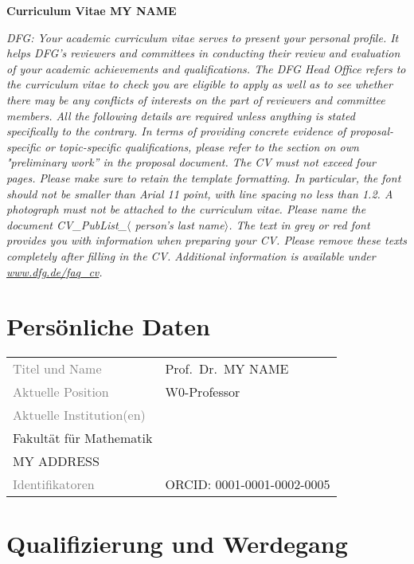 \documentclass[a4paper,11pt]{article} %
\def\mytitle{Prof.\ Dr.\ }
\def\myname{MY NAME}
\def\myinstitute{\begin{minipage}[t]{8cm}
MY UNIVERSITY\\
Fakultät für Mathematik\\
MY ADDRESS
\end{minipage}\vspace{.3ex}}
\def\myORCID{0001-0001-0002-0005} %
\def\myidentifier{ORCID: \myORCID}
\def\myposition{W0-Professor}
\begin{document}


\thispagestyle{empty}

\mbox{}
\vspace{-9ex}

\centerline{\Large \bf Curriculum Vitae \myname}
\emph{DFG: Your academic curriculum vitae serves to present your personal profile. It helps DFG’s reviewers and committees in conducting their review and evaluation of your academic achievements and qualifications. The DFG Head Office refers to the curriculum vitae to check you are eligible to apply as well as to see whether there may be any conflicts of interests on the part of reviewers and committee members. All the following details are required unless anything is stated specifically to the contrary.
In terms of providing concrete evidence of proposal-specific or topic-specific qualifications, please refer to the section on own "preliminary work” in the proposal document.
The CV must not exceed four pages. Please make sure to retain the template formatting. In particular, the font should not be smaller than Arial 11 point, with line spacing no less than 1.2. A photograph must not be attached to the curriculum vitae. Please 
name the document CV\_PubList\_$\langle$ person’s last name$\rangle$.
The text in grey or red font provides you with information when preparing your CV. Please remove these texts completely after filling in the CV.
Additional information is available under \url{www.dfg.de/faq_cv}.}

\section*{Persönliche Daten}

\noindent
\begin{tabularx}{\textwidth}{@{}ll}
\textcolor{gray}{Titel und Name} & \mytitle \myname \\
\textcolor{gray}{Aktuelle Position} & \myposition \\
\textcolor{gray}{Aktuelle Institution(en)} & \myinstitute \\
\textcolor{gray}{Identifikatoren} & \myidentifier
\end{tabularx}


\section*{Qualifizierung und Werdegang}
\end{document}
